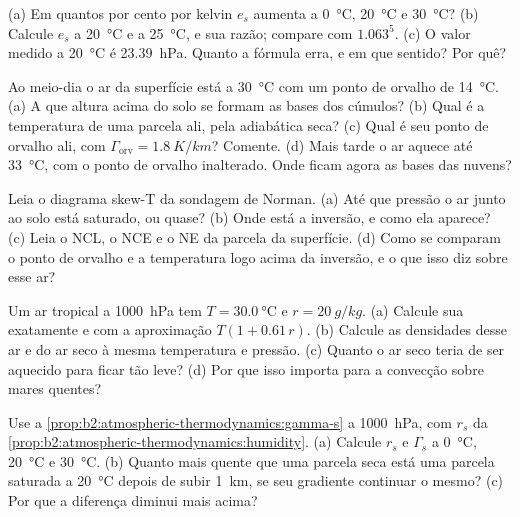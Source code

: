 \begin{exercise}[$\star$]\label{exo:b2:atmospheric-thermodynamics:2}
(a) Em quantos por cento por kelvin $e_s$ aumenta a \qty{0}{\celsius}, \qty{20}{\celsius} e
\qty{30}{\celsius}? (b) Calcule $e_s$ a \qty{20}{\celsius} e a \qty{25}{\celsius}, e sua
razão; compare com $1.063^5$. (c) O valor medido a \qty{20}{\celsius} é
\qty{23.39}{hPa}. Quanto a fórmula erra, e em que sentido? Por quê?
\end{exercise}

\begin{exercise}[$\star$]\label{exo:b2:atmospheric-thermodynamics:3}
Ao meio-dia o ar da superfície está a \qty{30}{\celsius} com um ponto de orvalho de \qty{14}{\celsius}. (a) A
que altura acima do solo se formam as bases dos cúmulos? (b) Qual é a temperatura de uma parcela
ali, pela adiabática seca? (c) Qual é seu ponto de orvalho ali, com $\Gamma_{\text{orv}} =
\qty{1.8}{K/km}$? Comente. (d) Mais tarde o ar aquece até \qty{33}{\celsius}, com o ponto de orvalho
inalterado. Onde ficam agora as bases das nuvens?
\end{exercise}

\begin{exercise}[$\star$]\label{exo:b2:atmospheric-thermodynamics:4}
Leia o diagrama skew-T da sondagem de Norman. (a) Até que pressão o ar junto ao
solo está saturado, ou quase? (b) Onde está a inversão, e como ela aparece? (c) Leia o
NCL, o NCE e o NE da parcela da superfície. (d) Como se comparam o ponto de orvalho e a temperatura
logo acima da inversão, e o que isso diz sobre esse ar?
\end{exercise}

\begin{exercise}[$\star\star$]\label{exo:b2:atmospheric-thermodynamics:5}
Um ar tropical a \qty{1000}{hPa} tem $T = \qty{30.0}{\celsius}$ e $r = \qty{20}{g/kg}$. (a) Calcule
sua  exatamente e com a aproximação $T(1 + 0.61\,r)$. (b) Calcule as densidades
desse ar e do ar seco à mesma temperatura e pressão. (c) Quanto o ar seco teria de ser
aquecido para ficar tão leve? (d) Por que isso importa para a convecção sobre mares quentes?
\end{exercise}

\begin{exercise}[$\star\star$]\label{exo:b2:atmospheric-thermodynamics:6}
Use a \cref{prop:b2:atmospheric-thermodynamics:gamma-s} a \qty{1000}{hPa}, com $r_s$ da
\cref{prop:b2:atmospheric-thermodynamics:humidity}. (a) Calcule $r_s$ e $\Gamma_s$ a
\qty{0}{\celsius}, \qty{20}{\celsius} e \qty{30}{\celsius}. (b) Quanto mais quente que uma parcela
seca está uma parcela saturada a \qty{20}{\celsius} depois de subir \qty{1}{km}, se seu gradiente
continuar o mesmo? (c) Por que a diferença diminui mais acima?
\end{exercise}

